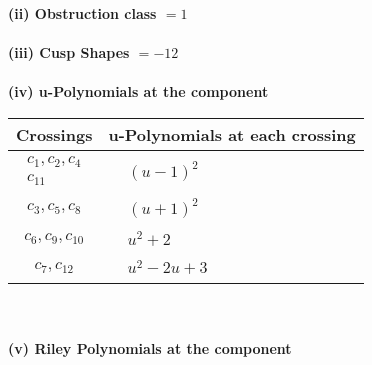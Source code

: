 \documentclass[1p]{elsarticle_modified}
\theoremstyle{definition}
\begin{document}
\flushleft \textbf{(ii) Obstruction class $= 1$}\\~\\
\flushleft \textbf{(iii) Cusp Shapes $= -12$}\\~\\
\newpage\renewcommand{\arraystretch}{1}
\flushleft \textbf{(iv) u-Polynomials at the component}\newline \\
\begin{tabular}{m{50pt}|m{274pt}}
Crossings & \hspace{64pt}u-Polynomials at each crossing \\
\hline $$\begin{aligned}c_{1},c_{2},c_{4}\\c_{11}\end{aligned}$$&$\begin{aligned}
&(u-1)^2
\end{aligned}$\\
\hline $$\begin{aligned}c_{3},c_{5},c_{8}\end{aligned}$$&$\begin{aligned}
&(u+1)^2
\end{aligned}$\\
\hline $$\begin{aligned}c_{6},c_{9},c_{10}\end{aligned}$$&$\begin{aligned}
&u^2+2
\end{aligned}$\\
\hline $$\begin{aligned}c_{7},c_{12}\end{aligned}$$&$\begin{aligned}
&u^2-2 u+3
\end{aligned}$\\
\hline
\end{tabular}\\~\\
\newpage\renewcommand{\arraystretch}{1}
\flushleft \textbf{(v) Riley Polynomials at the component}\newline \\
\end{document}
